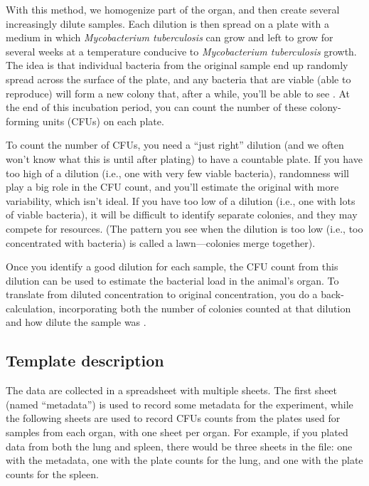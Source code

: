 \documentclass[
]{book}
\begin{document}
With this method, we homogenize part of the organ, and then create several
increasingly dilute samples. Each dilution is then spread on a plate with a
medium in which \emph{Mycobacterium tuberculosis} can grow and left to grow for
several weeks at a temperature conducive to \emph{Mycobacterium tuberculosis} growth.
The idea is that individual bacteria from the original sample end up randomly
spread across the surface of the plate, and any bacteria that are viable
(able to reproduce) will form a new colony that, after a while, you'll be able
to see \citep{wilson1922proportion, goldman2015practical}. At the end of this
incubation period, you can count the number of these colony-forming units
(CFUs) on each plate.

To count the number of CFUs, you need a ``just right'' dilution (and
we often won't know what this is until after plating) to have a countable
plate. If you have too high of a dilution (i.e., one with very few viable
bacteria), randomness will play a big role in the CFU count, and you'll estimate
the original with more variability, which isn't ideal. If you have too low
of a dilution (i.e., one with lots of viable bacteria), it will be difficult to
identify separate colonies, and they may compete for resources. (The pattern
you see when the dilution is too low (i.e., too concentrated with bacteria) is
called a lawn---colonies merge together).

Once you identify a good dilution for each sample, the CFU count from this
dilution can be used to estimate the bacterial load in the animal's organ. To
translate from diluted concentration to original concentration, you do a
back-calculation, incorporating both the number of colonies counted at that
dilution and how dilute the sample was \citep{ben2014estimation, goldman2015practical}.

\hypertarget{template-description-1}{%
\subsection{Template description}\label{template-description-1}}

The data are collected in a spreadsheet with multiple sheets. The first sheet
(named ``metadata'') is used to record some metadata for the experiment, while the
following sheets are used to record CFUs counts from the plates used for samples
from each organ, with one sheet per organ. For example, if you plated data
from both the lung and spleen, there would be three sheets in the file: one
with the metadata, one with the plate counts for the lung, and one with the
plate counts for the spleen.
\end{document}
